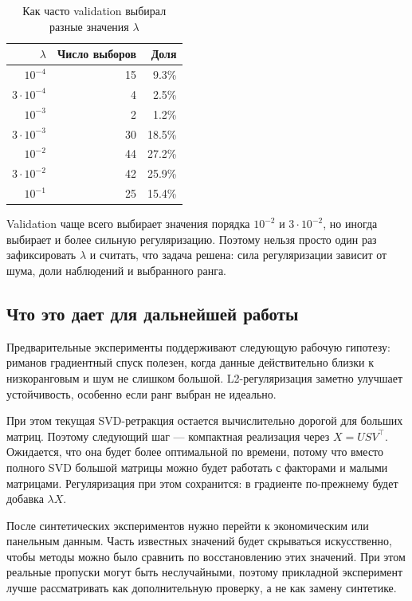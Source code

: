 \documentclass[a4paper,12pt]{article}
\begin{document}
\begin{table}[H]
\centering
\small
\caption{Как часто validation выбирал разные значения $\lambda$}
\label{tab:selected-lambda-final}
\begin{tabular}{rrr}
\toprule
$\lambda$ & Число выборов & Доля \\
\midrule
$10^{-4}$ & 15 & 9.3\% \\
$3\cdot10^{-4}$ & 4 & 2.5\% \\
$10^{-3}$ & 2 & 1.2\% \\
$3\cdot10^{-3}$ & 30 & 18.5\% \\
$10^{-2}$ & 44 & 27.2\% \\
$3\cdot10^{-2}$ & 42 & 25.9\% \\
$10^{-1}$ & 25 & 15.4\% \\
\bottomrule
\end{tabular}
\end{table}

Validation чаще всего выбирает значения порядка $10^{-2}$ и $3\cdot10^{-2}$, но иногда выбирает и более сильную регуляризацию. Поэтому нельзя просто один раз зафиксировать $\lambda$ и считать, что задача решена: сила регуляризации зависит от шума, доли наблюдений и выбранного ранга.

\subsection{Что это дает для дальнейшей работы}

Предварительные эксперименты поддерживают следующую рабочую гипотезу: риманов градиентный спуск полезен, когда данные действительно близки к низкоранговым и шум не слишком большой. L2-регуляризация заметно улучшает устойчивость, особенно если ранг выбран не идеально.

При этом текущая SVD-ретракция остается вычислительно дорогой для больших матриц. Поэтому следующий шаг --- компактная реализация через $X=USV^\top$. Ожидается, что она будет более оптимальной по времени, потому что вместо полного SVD большой матрицы можно будет работать с факторами и малыми матрицами. Регуляризация при этом сохранится: в градиенте по-прежнему будет добавка $\lambda X$.

После синтетических экспериментов нужно перейти к экономическим или панельным данным. Часть известных значений будет скрываться искусственно, чтобы методы можно было сравнить по восстановлению этих значений. При этом реальные пропуски могут быть неслучайными, поэтому прикладной эксперимент лучше рассматривать как дополнительную проверку, а не как замену синтетике.
\end{document}
